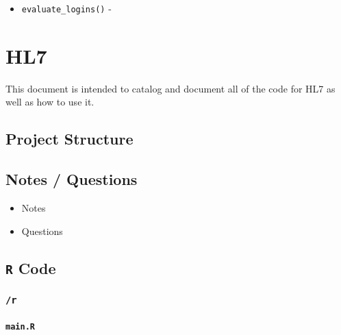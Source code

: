 \documentclass[
]{book}
\providecommand{\tightlist}{%
  \setlength{\itemsep}{0pt}\setlength{\parskip}{0pt}}
\begin{document}
\begin{itemize}
\tightlist
\item
  \texttt{evaluate\_logins()} -
\end{itemize}

\hypertarget{hl7}{%
\chapter{HL7}\label{hl7}}

This document is intended to catalog and document all of the code for HL7 as well as how to use it.

\hypertarget{project-structure-2}{%
\section{Project Structure}\label{project-structure-2}}

\hypertarget{notes-questions-2}{%
\section{Notes / Questions}\label{notes-questions-2}}

\begin{itemize}
\tightlist
\item
  Notes
\item
  Questions
\end{itemize}

\hypertarget{r-code-2}{%
\section{\texorpdfstring{\texttt{R} Code}{R Code}}\label{r-code-2}}

\hypertarget{r-2}{%
\subsection{\texorpdfstring{\texttt{/r}}{/r}}\label{r-2}}

\hypertarget{main.r-1}{%
\subsubsection{\texorpdfstring{\texttt{main.R}}{main.R}}\label{main.r-1}}
\end{document}
